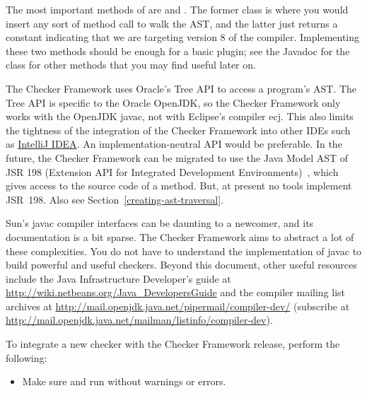 The most important methods of 
are  and . The former
class is where you would insert any sort of method call to walk the AST\@,
and the latter just returns a constant indicating that we are targeting
version 8 of the compiler. Implementing these two methods should be enough
for a basic plugin; see the Javadoc for the class for other methods that
you may find useful later on.

The Checker Framework uses Oracle's Tree API to access a program's AST\@.
The Tree API is specific to the Oracle OpenJDK, so the Checker Framework only
works with the OpenJDK javac, not with Eclipse's compiler ecj.
This also limits the tightness of
the integration of the Checker Framework into other IDEs such as \href{https://www.jetbrains.com/idea/}{IntelliJ IDEA}\@.
An implementation-neutral API would be preferable.
In the future, the Checker Framework
can be migrated to use the Java Model AST of JSR 198 (Extension API for
Integrated Development Environments)~\cite{JSR198}, which gives access to
the source code of a method.  But, at present no tools
implement JSR~198.  Also see Section~\ref{creating-ast-traversal}.




Sun's javac compiler interfaces can be daunting to a
newcomer, and its documentation is a bit sparse. The Checker Framework
aims to abstract a lot of these complexities.
You do not have to understand the implementation of javac to
build powerful and useful checkers.
Beyond this document,
other useful resources include the Java Infrastructure
Developer's guide at
\url{http://wiki.netbeans.org/Java_DevelopersGuide} and the compiler
mailing list archives at
\url{http://mail.openjdk.java.net/pipermail/compiler-dev/}
(subscribe at
\url{http://mail.openjdk.java.net/mailman/listinfo/compiler-dev}).




To integrate a new checker with the Checker Framework release, perform
the following:

\begin{itemize}

\item Make sure  and  run
without warnings or errors.

\end{itemize}


